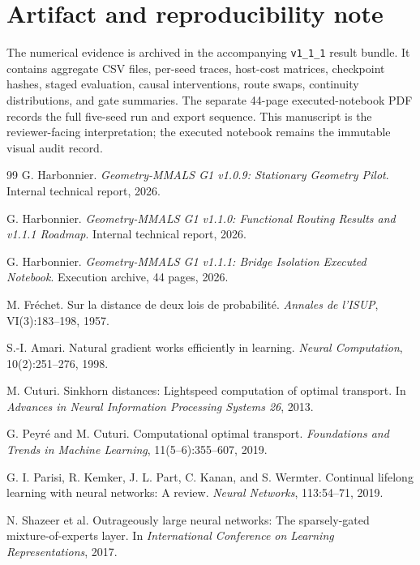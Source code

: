 \documentclass[11pt,a4paper]{article}
\begin{document}
\section{Artifact and reproducibility note}
The numerical evidence is archived in the accompanying \texttt{v1\_1\_1} result bundle. It contains aggregate CSV files, per-seed traces, host-cost matrices, checkpoint hashes, staged evaluation, causal interventions, route swaps, continuity distributions, and gate summaries. The separate 44-page executed-notebook PDF records the full five-seed run and export sequence. This manuscript is the reviewer-facing interpretation; the executed notebook remains the immutable visual audit record.

\begin{thebibliography}{99}
G. Harbonnier. \emph{Geometry-MMALS G1 v1.0.9: Stationary Geometry Pilot}. Internal technical report, 2026.

G. Harbonnier. \emph{Geometry-MMALS G1 v1.1.0: Functional Routing Results and v1.1.1 Roadmap}. Internal technical report, 2026.

G. Harbonnier. \emph{Geometry-MMALS G1 v1.1.1: Bridge Isolation Executed Notebook}. Execution archive, 44 pages, 2026.

M. Fr\'echet. Sur la distance de deux lois de probabilit\'e. \emph{Annales de l'ISUP}, VI(3):183--198, 1957.

S.-I. Amari. Natural gradient works efficiently in learning. \emph{Neural Computation}, 10(2):251--276, 1998.

M. Cuturi. Sinkhorn distances: Lightspeed computation of optimal transport. In \emph{Advances in Neural Information Processing Systems 26}, 2013.

G. Peyr\'e and M. Cuturi. Computational optimal transport. \emph{Foundations and Trends in Machine Learning}, 11(5--6):355--607, 2019.

G. I. Parisi, R. Kemker, J. L. Part, C. Kanan, and S. Wermter. Continual lifelong learning with neural networks: A review. \emph{Neural Networks}, 113:54--71, 2019.

N. Shazeer et al. Outrageously large neural networks: The sparsely-gated mixture-of-experts layer. In \emph{International Conference on Learning Representations}, 2017.
\end{thebibliography}
\end{document}
